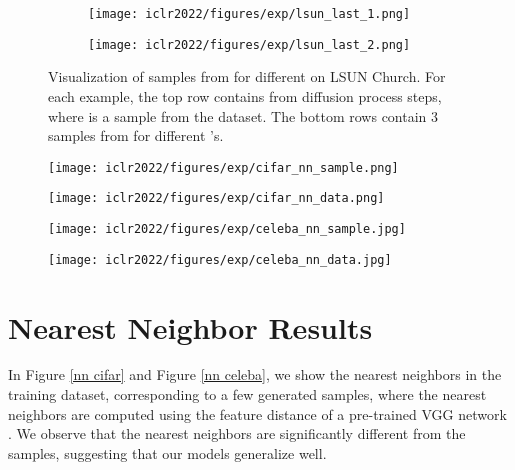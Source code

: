 \begin{figure}[h]
    \begin{subfigure}{.99\linewidth}
    \centering
    \texttt{[image: iclr2022/figures/exp/lsun\_last\_1.png]}
\end{subfigure} \begin{subfigure}{.99\linewidth}
    \centering
    \texttt{[image: iclr2022/figures/exp/lsun\_last\_2.png]}
\end{subfigure}
\caption{Visualization of samples from  for different  on LSUN Church. For each example, the top row contains  from diffusion process steps, where  is a sample from the dataset. The bottom rows contain 3 samples from  for different 's. }\label{fig: lsun x0}
\end{figure}

\begin{figure*}[ht]
    \centering
    \begin{subfigure}{.1\linewidth}
    \texttt{[image: iclr2022/figures/exp/cifar\_nn\_sample.png]}
    \end{subfigure}
    \begin{subfigure}{.65\linewidth}
    \texttt{[image: iclr2022/figures/exp/cifar\_nn\_data.png]}
    \end{subfigure}
    \caption{\label{nn cifar}
    CIFAR-10 nearest neighbors in VGG feature space. Generated samples are in the leftmost column, and training set nearest neighbors are in the remaining columns.}
\end{figure*}

\begin{figure*}[ht]
    \centering
    \begin{subfigure}{.09\linewidth}
    \texttt{[image: iclr2022/figures/exp/celeba\_nn\_sample.jpg]}
    \end{subfigure}
    \begin{subfigure}{.9\linewidth}
    \texttt{[image: iclr2022/figures/exp/celeba\_nn\_data.jpg]}
    \end{subfigure}
    \caption{\label{nn celeba}
     CelebA-HQ nearest neighbors in the VGG feature space. Generated samples are in the leftmost column, and training set nearest neighbors are in the
     remaining columns.}
\end{figure*}



\section{Nearest Neighbor Results} \label{app: nearest neighbor}
In Figure \ref{nn cifar} and Figure \ref{nn celeba}, we show the nearest neighbors in the training dataset, corresponding to a few generated samples, where the nearest neighbors are computed using the feature distance of a pre-trained VGG network \citep{simonyan2014very}. We observe that the nearest neighbors are significantly different from the samples, suggesting that our models generalize well.